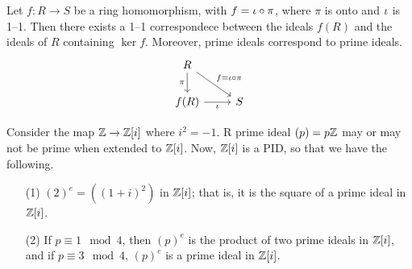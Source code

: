 \begin{proposition}\label{proposition_5.6.3}
    Let $f:R \xrightarrow{} S$ be a ring homomorphism, with $f=\iota \circ \pi$,
    where  $\pi$ is onto and  $\iota$ is 1--1. Then there exists a 1--1
    correspondece between the ideals $f(R)$ and the ideals of $R$ containing
     $\ker{f}$. Moreover, prime ideals correspond to prime ideals.
     \[\begin{tikzcd}
        R \\
        {f(R)} & S
        \arrow["\pi"', from=1-1, to=2-1]
        \arrow["\iota"', from=2-1, to=2-2]
        \arrow["{f=\iota \circ \pi}", from=1-1, to=2-2]
      \end{tikzcd}\]
\end{proposition}

\begin{example}\label{example_1.22}
    Consider the map $\mathbb{Z} \xrightarrow{} \mathbb{Z}[i]$ where $i^2=-1$. R prime ideal
    $(p)=p\mathbb{Z}$ may or may not be prime when extended to $\mathbb{Z}[i]$. Now, $\mathbb{Z}[i]$ is
        a PID, so that we have the following.
        \begin{enumerate}
            \item[(1)] $(2)^e=((1+i)^2)$ in $\mathbb{Z}[i]$; that is, it is the square
                of a prime ideal in $\mathbb{Z}[i]$.

            \item[(2)] If $p \equiv 1 \mod{4}$, then $(p)^e$ is the product of
                two prime ideals in $\mathbb{Z}[i]$, and if $p \equiv 3 \mod{4}$,
                $(p)^e$ is a prime ideal in $\mathbb{Z}[i]$.
        \end{enumerate}
\end{example}

